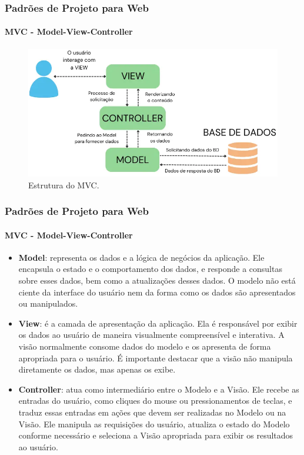 \documentclass[
	9pt, %
	t, %
]{beamer}
\begin{document}
\begin{frame}
	\frametitle{Padrões de Projeto para Web}
	\framesubtitle{MVC - Model-View-Controller}

	\begin{figure}
		\centering
		\includegraphics[width=0.9\linewidth]{Images/mvc.png}
		\caption{Estrutura do MVC.}\label{fig:mvc}
	\end{figure}

\end{frame}

\begin{frame}
	\frametitle{Padrões de Projeto para Web}
	\framesubtitle{MVC - Model-View-Controller}

	\begin{itemize}
		\item \textbf{Model}: representa os dados e a lógica de negócios da aplicação. Ele encapsula o estado e o comportamento dos dados, e responde a consultas sobre esses dados, bem como a atualizações desses dados. O modelo não está ciente da interface do usuário nem da forma como os dados são apresentados ou manipulados.
		\item \textbf{View}: é a camada de apresentação da aplicação. Ela é responsável por exibir os dados ao usuário de maneira visualmente compreensível e interativa. A visão normalmente consome dados do modelo e os apresenta de forma apropriada para o usuário. É importante destacar que a visão não manipula diretamente os dados, mas apenas os exibe.
		\item \textbf{Controller}: atua como intermediário entre o Modelo e a Visão. Ele recebe as entradas do usuário, como cliques do mouse ou pressionamentos de teclas, e traduz essas entradas em ações que devem ser realizadas no Modelo ou na Visão. Ele manipula as requisições do usuário, atualiza o estado do Modelo conforme necessário e seleciona a Visão apropriada para exibir os resultados ao usuário.
	\end{itemize}

\end{frame}
\end{document}
